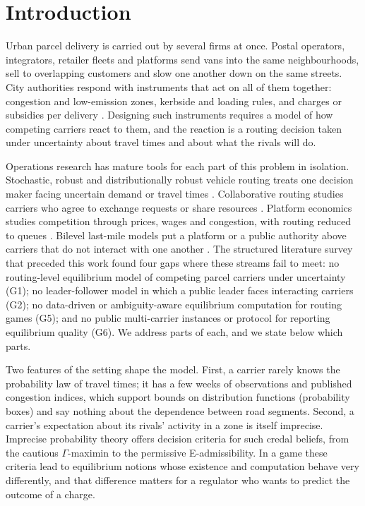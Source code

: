 \documentclass[preprint,12pt]{elsarticle}
\theoremstyle{definition}
\theoremstyle{remark}
\begin{document}
\section{Introduction}\label{sec:intro}

Urban parcel delivery is carried out by several firms at once. Postal operators, integrators, retailer fleets and platforms send vans into the same neighbourhoods, sell to overlapping customers and slow one another down on the same streets. City authorities respond with instruments that act on all of them together: congestion and low-emission zones, kerbside and loading rules, and charges or subsidies per delivery \citep{Quak2009,HolguinVeras2016,Dey2019,XuSun2024}. Designing such instruments requires a model of how competing carriers react to them, and the reaction is a routing decision taken under uncertainty about travel times and about what the rivals will do.

Operations research has mature tools for each part of this problem in isolation. Stochastic, robust and distributionally robust vehicle routing treats one decision maker facing uncertain demand or travel times \citep{Gendreau2016,GhosalWiesemann2020,Zhang2021,GhosalHoWiesemann2024}. Collaborative routing studies carriers who agree to exchange requests or share resources \citep{GanstererHartl2018,Cleophas2019,Los2025}. Platform economics studies competition through prices, wages and congestion, with routing reduced to queues \citep{Taylor2018,Bernstein2021,Benjaafar2022}. Bilevel last-mile models put a platform or a public authority above carriers that do not interact with one another \citep{Catalano2014,Cerulli2024}. The structured literature survey that preceded this work found four gaps where these streams fail to meet: no routing-level equilibrium model of competing parcel carriers under uncertainty (G1); no leader-follower model in which a public leader faces interacting carriers (G2); no data-driven or ambiguity-aware equilibrium computation for routing games (G5); and no public multi-carrier instances or protocol for reporting equilibrium quality (G6). We address parts of each, and we state below which parts.

Two features of the setting shape the model. First, a carrier rarely knows the probability law of travel times; it has a few weeks of observations and published congestion indices, which support bounds on distribution functions (probability boxes) and say nothing about the dependence between road segments. Second, a carrier's expectation about its rivals' activity in a zone is itself imprecise. Imprecise probability theory \citep{Walley1991,Troffaes2007} offers decision criteria for such credal beliefs, from the cautious $\Gamma$-maximin to the permissive E-admissibility. In a game these criteria lead to equilibrium notions whose existence and computation behave very differently, and that difference matters for a regulator who wants to predict the outcome of a charge.
\end{document}
